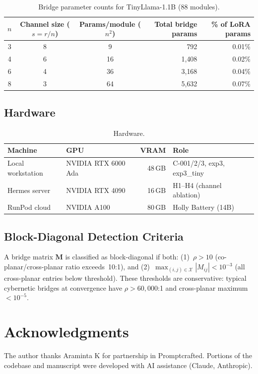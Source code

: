 \documentclass[11pt]{article}
\begin{document}
\begin{table}[H]
\centering
\caption{Bridge parameter counts for TinyLlama-1.1B (88 modules).}
\label{tab:bridgeparams}
\begin{tabular}{cccrr}
\toprule
$n$ & Channel size ($s = r/n$) & Params/module ($n^2$) & Total bridge params & \% of LoRA params \\
\midrule
3 & 8 & 9 & 792 & 0.01\% \\
4 & 6 & 16 & 1{,}408 & 0.02\% \\
6 & 4 & 36 & 3{,}168 & 0.04\% \\
8 & 3 & 64 & 5{,}632 & 0.07\% \\
\bottomrule
\end{tabular}
\end{table}

\subsection{Hardware}

\begin{table}[H]
\centering
\caption{Hardware.}
\label{tab:hardware}
\begin{tabular}{llrl}
\toprule
Machine & GPU & VRAM & Role \\
\midrule
Local workstation & NVIDIA RTX 6000 Ada & 48\,GB & C-001/2/3, exp3, exp3\_tiny \\
Hermes server & NVIDIA RTX 4090 & 16\,GB & H1--H4 (channel ablation) \\
RunPod cloud & NVIDIA A100 & 80\,GB & Holly Battery (14B) \\
\bottomrule
\end{tabular}
\end{table}

\subsection{Block-Diagonal Detection Criteria}

A bridge matrix $\mathbf{M}$ is classified as block-diagonal if both:
(1)~$\rho > 10$ (co-planar/cross-planar ratio exceeds~10:1), and
(2)~$\max_{(i,j) \in \mathcal{X}} |M_{ij}| < 10^{-3}$ (all
cross-planar entries below threshold). These thresholds are
conservative: typical cybernetic bridges at convergence have
$\rho > 60{,}000$:1 and cross-planar maximum $< 10^{-5}$.


\section*{Acknowledgments}

The author thanks Araminta K for partnership in Promptcrafted.
Portions of the codebase and manuscript were developed with AI
assistance (Claude, Anthropic).



\end{document}
